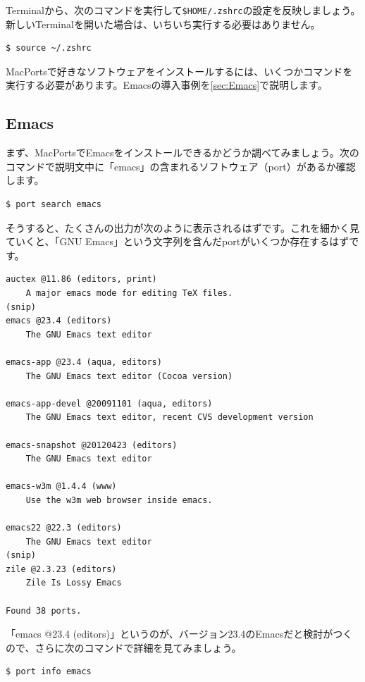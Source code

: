Terminalから、次のコマンドを実行して\texttt{\$HOME/.zshrc}の設定を反映しましょう。新しいTerminalを開いた場合は、いちいち実行する必要はありません。

\begin{lstlisting}[language=bash]
$ source ~/.zshrc
\end{lstlisting}

MacPortsで好きなソフトウェアをインストールするには、いくつかコマンドを実行する必要があります。Emacsの導入事例を\ref{sec:Emacs}で説明します。

\subsection{Emacs}

まず、MacPortsでEmacsをインストールできるかどうか調べてみましょう。次のコマンドで説明文中に「emacs」の含まれるソフトウェア（port）があるか確認します。

\begin{lstlisting}[language=bash]
$ port search emacs
\end{lstlisting}

そうすると、たくさんの出力が次のように表示されるはずです。これを細かく見ていくと、「GNU Emacs」という文字列を含んだportがいくつか存在するはずです。

\begin{lstlisting}
auctex @11.86 (editors, print)
    A major emacs mode for editing TeX files.
(snip)
emacs @23.4 (editors)
    The GNU Emacs text editor

emacs-app @23.4 (aqua, editors)
    The GNU Emacs text editor (Cocoa version)

emacs-app-devel @20091101 (aqua, editors)
    The GNU Emacs text editor, recent CVS development version

emacs-snapshot @20120423 (editors)
    The GNU Emacs text editor

emacs-w3m @1.4.4 (www)
    Use the w3m web browser inside emacs.

emacs22 @22.3 (editors)
    The GNU Emacs text editor
(snip)
zile @2.3.23 (editors)
    Zile Is Lossy Emacs

Found 38 ports.
\end{lstlisting}

「emacs @23.4 (editors)」というのが、バージョン23.4のEmacsだと検討がつくので、さらに次のコマンドで詳細を見てみましょう。

\begin{lstlisting}[language=bash]
$ port info emacs
\end{lstlisting}


